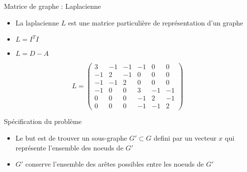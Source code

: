 \begin{frame}{Matrice de graphe : Laplacienne}
    \begin{minipage}{0.49\linewidth}
        \begin{itemize}
            \item La \alert{laplacienne} $L$ est une matrice particulière de représentation d'un graphe
            \item $L = I^{T}I$
            \item $L = D - A$
        \end{itemize}
        \footnotesize{$$
            L = \begin{pmatrix}
                3 & -1 & -1 & -1 & 0 & 0\\
                -1 & 2 & -1 & 0 & 0 & 0\\
                -1 & -1 & 2 & 0 & 0 & 0\\
                -1 & 0 & 0 & 3 & -1 & -1\\
                0 & 0 & 0 & -1 & 2 & -1\\
                0 & 0 & 0 & -1 & -1 & 2
            \end{pmatrix}
        $$}
    \end{minipage}
    \begin{minipage}{0.49\linewidth}
    \end{minipage}
\end{frame}

\begin{frame}{Spécification du problème}
    \begin{minipage}{0.49\linewidth}
        \begin{itemize}
            \item Le but est de trouver un sous-graphe $G'\subset G$ defini par un vecteur $x$ qui représente l'ensemble des noeuds de $G'$
            \item $G'$ conserve l'ensemble des arêtes possibles entre les noeuds de $G'$
        \end{itemize}
    \end{minipage}
    \begin{minipage}{0.49\linewidth}

    \end{minipage}
\end{frame}

